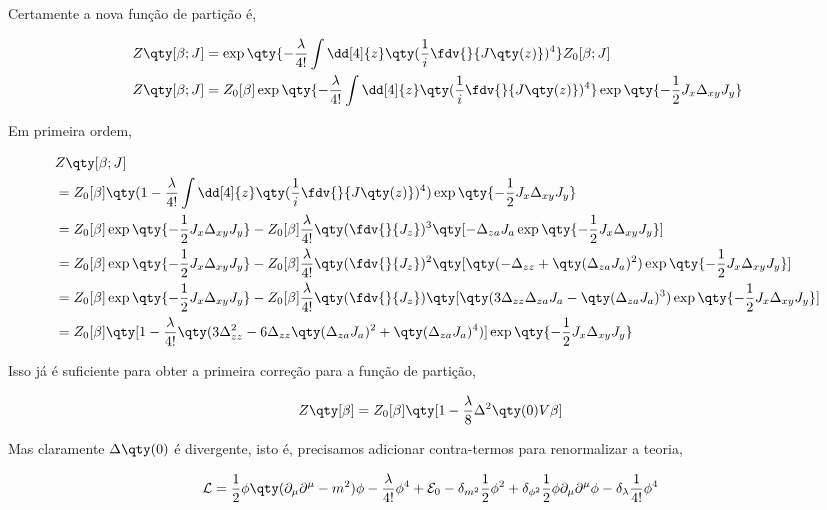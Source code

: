 \documentclass[twoside]{amsart}
\numberwithin{equation}{section}
\begin{document}
\begin{refsection}
Certamente a nova função de partição é,

\begin{align}
    Z\qty[\beta; J]&=\exp\qty{-\frac{\lambda}{4!}\int\dd[4]{z}\qty(\frac{1}{i}\fdv{}{J\qty(z)})^4}Z_0[\beta;J]\\
    Z\qty[\beta; J]&=Z_0[\beta]\exp\qty{-\frac{\lambda}{4!}\int\dd[4]{z}\qty(\frac{1}{i}\fdv{}{J\qty(z)})^4}\exp\qty{-\frac12J_x\Delta_{xy}J_y}
\end{align}

Em primeira ordem,

\begin{align}
    &Z\qty[\beta; J]\\
    &=Z_0[\beta]\qty(1-\frac{\lambda}{4!}\int\dd[4]{z}\qty(\frac{1}{i}\fdv{}{J\qty(z)})^4)\exp\qty{-\frac12J_x\Delta_{xy}J_y}\\
    &=Z_0[\beta]\exp\qty{-\frac12J_x\Delta_{xy}J_y}-Z_0[\beta]\frac{\lambda}{4!}\qty(\fdv{}{J_z})^3\qty[-\Delta_{za}J_a\exp\qty{-\frac12J_x\Delta_{xy}J_y}]\\
    &=Z_0[\beta]\exp\qty{-\frac12J_x\Delta_{xy}J_y}-Z_0[\beta]\frac{\lambda}{4!}\qty(\fdv{}{J_z})^2\qty[\qty(-\Delta_{zz}+\qty(\Delta_{za}J_a)^2)\exp\qty{-\frac12J_x\Delta_{xy}J_y}]\\
    &=Z_0[\beta]\exp\qty{-\frac12J_x\Delta_{xy}J_y}-Z_0[\beta]\frac{\lambda}{4!}\qty(\fdv{}{J_z})\qty[\qty(3\Delta_{zz}\Delta_{za}J_a-\qty(\Delta_{za}J_a)^3)\exp\qty{-\frac12J_x\Delta_{xy}J_y}]\\
    &=Z_0[\beta]\qty[1-\frac{\lambda}{4!}\qty(3\Delta^2_{zz}-6\Delta_{zz}\qty(\Delta_{za}J_a)^2+\qty(\Delta_{za}J_a)^4)]\exp\qty{-\frac12J_x\Delta_{xy}J_y}
\end{align}

Isso já é suficiente para obter a primeira correção para a função de partição,

\begin{align}
    Z\qty[\beta]&=Z_0[\beta]\qty[1-\frac{\lambda}{8}\Delta^2\qty(0)V\beta]
\end{align}

Mas claramente $\Delta\qty(0)$ é divergente, isto é, precisamos adicionar contra-termos para renormalizar a teoria,

\begin{align}
    \mathcal L&=\frac12\phi\qty(\partial_\mu\partial^\mu-m^2)\phi-\frac{\lambda}{4!}\phi^4+\mathcal E_0-\delta_{m^2}\frac12\phi^2+\delta_{\phi^2}\frac12\phi\partial_\mu\partial^\mu\phi-\delta_{\lambda}\frac{1}{4!}\phi^4
\end{align}


\end{refsection}
\end{document}
